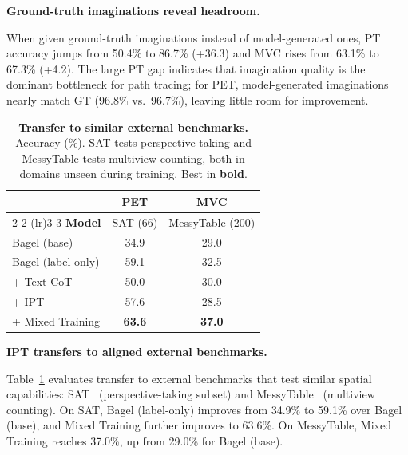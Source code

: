 \documentclass{llmxive}
\begin{document}
\begin{takeawayblock}
    \textbf{Ground-truth imaginations reveal headroom.}
\end{takeawayblock}
When given ground-truth imaginations instead of model-generated ones, PT accuracy jumps from 50.4\% to 86.7\% (+36.3) and MVC rises from 63.1\% to 67.3\% (+4.2).
The large PT gap indicates that imagination quality is the dominant bottleneck for path tracing; for PET, model-generated imaginations nearly match GT (96.8\% vs.\ 96.7\%), leaving little room for improvement.

\begin{table}[t]
  \vspace{-1em}
  \centering
  \setlength{\tabcolsep}{6pt}
  \small
  \begin{tabular}{l cc}
    \toprule
    & \textbf{PET} & \textbf{MVC} \\
    \cmidrule(lr){2-2} \cmidrule(lr){3-3}
    \textbf{Model}
      & \footnotesize SAT (66)
      & \footnotesize MessyTable (200) \\
    \midrule
    Bagel (base)       & 34.9 & 29.0 \\
    Bagel (label-only) & 59.1 & 32.5 \\
    + Text CoT         & 50.0 & 30.0 \\
    + IPT              & 57.6 & 28.5 \\
    + Mixed Training   & \textbf{63.6} & \textbf{37.0} \\
    \bottomrule
  \end{tabular}
  \label{tab:transfer}
\caption{\textbf{Transfer to similar external benchmarks.} Accuracy (\%). SAT tests perspective taking and MessyTable tests multiview counting, both in domains unseen during training. Best in \textbf{bold}.}
\end{table}
\vspace{-1em}


\begin{takeawayblock}
    \textbf{IPT transfers to aligned external benchmarks.}
\end{takeawayblock}
Table~\ref{tab:transfer} evaluates transfer to external benchmarks that test similar spatial capabilities: SAT~\cite{ray2025satdynamicspatialaptitude} (perspective-taking subset) and MessyTable~\cite{cai2020messytable} (multiview counting).
On SAT, Bagel (label-only) improves from 34.9\% to 59.1\% over Bagel (base), and Mixed Training further improves to 63.6\%.
On MessyTable, Mixed Training reaches 37.0\%, up from 29.0\% for Bagel (base).
\end{document}
